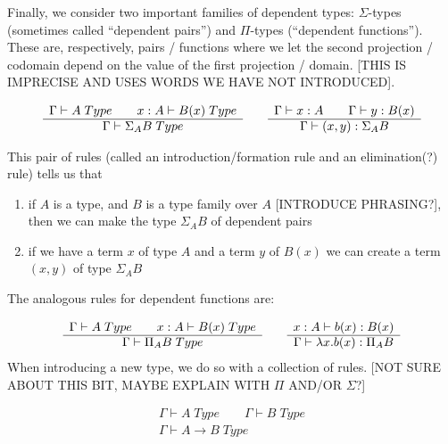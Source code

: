 Finally, we consider two important families of dependent types: $\Sigma$-types
(sometimes called ``dependent pairs'') and $\Pi$-types (``dependent
functions''). These are, respectively, pairs / functions where we let the
second projection / codomain depend on the value of the first projection /
domain. [THIS IS IMPRECISE AND USES WORDS WE HAVE NOT INTRODUCED].

\[
  \begin{array}[t]{c}
    \Gamma \vdash A \; Type \qquad x:A \vdash B(x) \; Type\\
    \hline
    \Gamma \vdash \Sigma_A B \; Type\\
  \end{array}
  \qquad
  \begin{array}[t]{c}
    \Gamma \vdash x:A \qquad \Gamma \vdash y : B(x)\\
    \hline
    \Gamma \vdash (x , y) : \Sigma_A B
  \end{array}
\]

This pair of rules (called an introduction/formation rule and an elimination(?) rule)
tells us that
\begin{enumerate}
\item if $A$ is a type, and $B$ is a type family over $A$ [INTRODUCE PHRASING?],
  then we can make the type $\Sigma_A B$ of dependent pairs
  \item if we have a term $x$ of type $A$ and a term $y$ of $B(x)$ we can create
    a term $(x,y)$ of type $\Sigma_A B$
\end{enumerate}

The analogous rules for dependent functions are:

\[
  \begin{array}[t]{c}
    \Gamma \vdash A \; Type \qquad x:A \vdash B(x) \; Type\\
    \hline
    \Gamma \vdash \Pi_A B \; Type\\
  \end{array}
  \qquad
  \begin{array}[t]{c}
    x:A \vdash b(x) : B(x)\\
    \hline
    \Gamma \vdash \lambda x.b(x) : \Pi_A B
  \end{array}
\]
When introducing a new type, we do so with a collection of rules. [NOT SURE
ABOUT THIS BIT, MAYBE EXPLAIN WITH $\Pi$ AND/OR $\Sigma$?]

\begin{equation}
  \begin{array}{c}
    \Gamma \vdash A \; Type \qquad \Gamma \vdash B \; Type\\
    \hline
    \Gamma \vdash A \rightarrow B \; Type
  \end{array}
  \label{rule:function-intro}
\end{equation}


